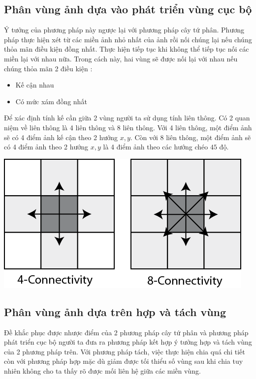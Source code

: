 \documentclass[12pt, oneside, a4]{book}
\begin{document}
\subsection{Phân vùng ảnh dựa vào phát triển vùng cục bộ}
Ý tưởng của phương pháp này ngược lại với phương pháp cây tứ phân. Phương pháp thực hiện xét từ các miền ảnh nhỏ nhất của ảnh rồi nối chúng lại nếu chúng thỏa mãn điều kiện đồng nhất. Thực hiện tiếp tục khi không thể tiếp tục nối các miền lại với nhau nữa.
Trong cách này, hai vùng sẽ được nối lại với nhau nếu chúng thỏa mãn 2 điều kiện :
\begin{itemize}
\item Kế cận nhau
\item Có mức xám đồng nhất
\end{itemize}

Để xác định tính kế cần giữa 2 vùng người ta sử dụng tính liên thông. Có 2 quan niệm về liên thông là 4 liên thông và 8 liên thông. Với 4 liên thông,  một điểm ảnh sẽ có 4 điểm ảnh kế cận theo 2 hướng $x,y$. Còn với 8 liên thông, một điểm ảnh sẽ có 4 điểm ảnh theo 2 hướng $x,y$ là 4 điểm ảnh theo các hướng chéo $45$ độ.
\begin{center}
\includegraphics[scale=0.7]{figure/4-8-connectivity.png}
\end{center}
\subsection{Phân vùng ảnh dựa trên hợp và tách vùng}
Đề khắc phục được nhược điểm của 2 phương pháp cây tứ phân và phương pháp phát triển cục bộ người ta đưa ra phương pháp kết hợp ý tưởng hợp và tách vùng của 2 phương pháp trên. Với phương pháp tách, việc thực hiện chia quá chi tiết còn với phương pháp hợp mặc dù giảm được tối thiểu số vùng sau khi chia tuy nhiên không cho ta thấy rõ được mối liên hệ giữa các miền vùng.
\end{document}

